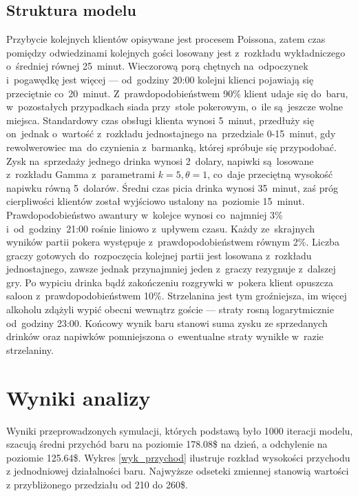 \documentclass[12pt, a4paper, oneside]{mwart} %
\begin{document}
\subsection{Struktura modelu}
Przybycie kolejnych klientów opisywane jest procesem Poissona, zatem czas pomiędzy odwiedzinami kolejnych gości losowany jest z~rozkładu wykładniczego o~średniej równej 25~minut. Wieczorową porą chętnych na~odpoczynek i~pogawędkę jest więcej --- od~godziny 20:00 kolejni klienci pojawiają się przeciętnie co~20~minut. Z~prawdopodobieństwem 90\% klient udaje się do~baru, w~pozostałych przypadkach siada przy~stole pokerowym, o~ile są~jeszcze wolne miejsca. Standardowy czas obsługi klienta wynosi 5~minut, przedłuży się on~jednak o~wartość z~rozkładu jednostajnego na~przedziale 0-15~minut, gdy rewolwerowiec ma~do czynienia z~barmanką, której spróbuje się przypodobać. Zysk na~sprzedaży jednego drinka wynosi 2~dolary, napiwki są~losowane z~rozkładu Gamma z~parametrami $k = 5, \theta = 1$, co~daje przeciętną wysokość napiwku równą 5~dolarów. Średni czas picia drinka wynosi 35~minut, zaś próg cierpliwości klientów został wyjściowo ustalony na~poziomie 15~minut. Prawdopodobieństwo awantury w~kolejce wynosi co~najmniej 3\% i~od~godziny~21:00 rośnie liniowo z~upływem czasu. Każdy ze~skrajnych wyników partii pokera występuje z~prawdopodobieństwem równym 2\%. Liczba graczy gotowych do~rozpoczęcia kolejnej partii jest losowana z~rozkładu jednostajnego, zawsze jednak przynajmniej jeden z~graczy rezygnuje z~dalszej gry. Po wypiciu drinka bądź zakończeniu rozgrywki w~pokera klient opuszcza saloon z~prawdopodobieństwem 10\%. Strzelanina jest tym groźniejsza, im więcej alkoholu zdążyli wypić obecni wewnątrz goście --- straty rosną logarytmicznie od~godziny 23:00. Końcowy wynik baru stanowi suma zysku ze sprzedanych drinków oraz napiwków pomniejszona o~ewentualne straty wynikłe w~razie strzelaniny.

\section{Wyniki analizy}
Wyniki przeprowadzonych symulacji, których podstawą było 1000 iteracji modelu, szacują średni przychód baru na poziomie 178.08\$ na dzień, a odchylenie na poziomie 125.64\$. Wykres \ref{wyk_przychod} ilustruje rozkład wysokości przychodu z jednodniowej działalności baru. Najwyższe odseteki zmiennej stanowią wartości z przybliżonego przedziału od 210 do 260\$.
\end{document}
